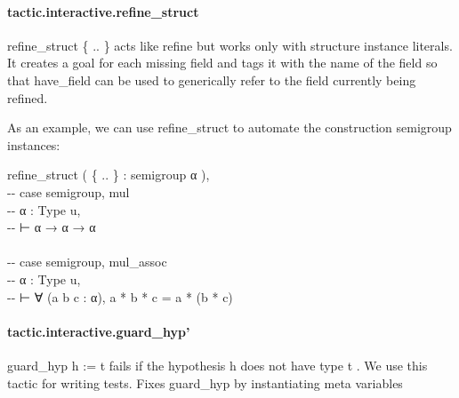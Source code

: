 \documentclass{article}
\begin{document}
\paragraph{tactic.interactive.refine\_struct}
\par
\colorbox[RGB]{253,246,227}{{{{\color[RGB]{101, 123, 131} refine\_struct \{ .. \} }}}} acts like 
\colorbox[RGB]{253,246,227}{{{{\color[RGB]{101, 123, 131} refine }}}} but works only with structure instance
literals. It creates a goal for each missing field and tags it with the name of the
field so that 
\colorbox[RGB]{253,246,227}{{{{\color[RGB]{101, 123, 131} have\_field }}}} can be used to generically refer to the field currently
being refined.
\par
As an example, we can use 
\colorbox[RGB]{253,246,227}{{{{\color[RGB]{101, 123, 131} refine\_struct }}}} to automate the construction semigroup
instances:
\\
\colorbox[RGB]{253,246,227}{\parbox{4.5in}{{{{\color[RGB]{101, 123, 131} refine\_struct ( \{ .. \} : semigroup α ),
 }}}\\
{{{\color[RGB]{147, 161, 161} -{}- }}}{{{\color[RGB]{147, 161, 161}  case semigroup, mul }}}{{{\color[RGB]{101, 123, 131} 
 }}}\\
{{{\color[RGB]{147, 161, 161} -{}- }}}{{{\color[RGB]{147, 161, 161}  α : Type u, }}}{{{\color[RGB]{101, 123, 131} 
 }}}\\
{{{\color[RGB]{147, 161, 161} -{}- }}}{{{\color[RGB]{147, 161, 161}  ⊢ α → α → α }}}{{{\color[RGB]{101, 123, 131} 
 }}}\\
{{{\color[RGB]{101, 123, 131} 
 }}}\\
{{{\color[RGB]{147, 161, 161} -{}- }}}{{{\color[RGB]{147, 161, 161}  case semigroup, mul\_assoc }}}{{{\color[RGB]{101, 123, 131} 
 }}}\\
{{{\color[RGB]{147, 161, 161} -{}- }}}{{{\color[RGB]{147, 161, 161}  α : Type u, }}}{{{\color[RGB]{101, 123, 131} 
 }}}\\
{{{\color[RGB]{147, 161, 161} -{}- }}}{{{\color[RGB]{147, 161, 161}  ⊢ ∀ (a b c : α), a * b * c = a * (b * c) }}}{{{\color[RGB]{101, 123, 131} 
 }}}\\

}}\paragraph{tactic.interactive.guard\_hyp'}
\par
\colorbox[RGB]{253,246,227}{{{{\color[RGB]{101, 123, 131} guard\_hyp h  }}}{{{\color[RGB]{181, 137, 0} := }}}{{{\color[RGB]{101, 123, 131}  t }}}} fails if the hypothesis 
\colorbox[RGB]{253,246,227}{{{{\color[RGB]{101, 123, 131} h }}}} does not have type 
\colorbox[RGB]{253,246,227}{{{{\color[RGB]{101, 123, 131} t }}}}.
We use this tactic for writing tests.
Fixes 
\colorbox[RGB]{253,246,227}{{{{\color[RGB]{101, 123, 131} guard\_hyp }}}} by instantiating meta variables
\end{document}
